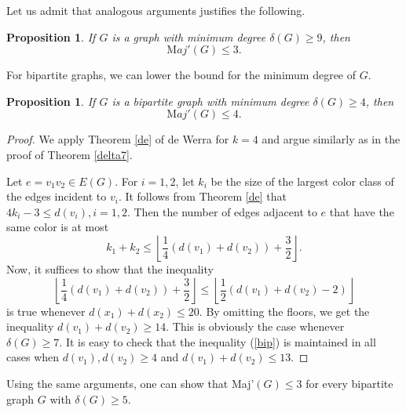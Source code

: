 \documentclass[11pt]{article}
\newtheorem{proposition}[theorem]{Proposition}
\begin{document}
Let us admit that analogous arguments justifies the following.

\begin{proposition}\label{delta9}
If $G$ is a graph with minimum degree $\delta(G)\ge 9$, then $${\mathrm Maj'}(G)\le 3.$$ 
\end{proposition}

For bipartite graphs, we can lower the bound for the minimum degree of $G$.
\begin{proposition}
If $G$ is a bipartite graph with minimum degree $\delta(G)\ge 4$, then  $${\mathrm Maj'}(G)\le 4.$$   
\end{proposition}
\begin{proof}  We apply Theorem \ref{de} of de Werra for $k=4$ and argue similarly as in the proof of Theorem \ref{delta7}.

Let $e=v_1v_2\in E(G)$. For $i=1,2$, let $k_i$ be the size of the largest color class of the edges incident to $v_i$. It follows from  Theorem \ref{de} that $4k_i-3\le d(v_i), i=1,2.$ Then the number of edges adjacent to $e$ that have the same color is at most $$k_1+k_2\le \left\lfloor\frac14(d(v_1)+d(v_2))+\frac32\right\rfloor.$$ 
Now, it suffices to show that the inequality 
\begin{equation}\label{bip}
\left\lfloor\frac14(d(v_1)+d(v_2))+\frac32\right\rfloor\le \left\lfloor\frac12(d(v_1)+d(v_2)-2)\right\rfloor
\end{equation}
is true whenever $d(x_1)+d(x_2)\le 20$. By omitting the floors, we get the inequality $d(v_1)+d(v_2)\ge 14$.
This is obviously the case whenever $\delta(G)\ge 7.$ It is easy to check that the inequality (\ref{bip}) is maintained in all cases when $d(v_1),d(v_2)\ge 4$ and $d(v_1)+d(v_2)\le 13$. 
\end{proof}

Using the same arguments, one can show that Maj'$(G)\le 3$ for every bipartite graph $G$ with $\delta(G)\ge 5$.
\end{document}
